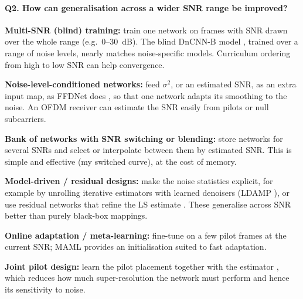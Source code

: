 \documentclass[a4paper,10pt]{article}
\newenvironment{packed_enum}{
\begin{enumerate}
  \setlength{\itemsep}{1.5pt}
  \setlength{\parskip}{0pt}
  \setlength{\parsep}{0pt}
}{\end{enumerate}}
\begin{document}
\paragraph{Q2. How can generalisation across a wider SNR range be improved?}
\begin{packed_enum}
    \item \textbf{Multi-SNR (blind) training:} train one network on frames with SNR drawn over the whole range (e.g.\ 0--30~dB). The blind DnCNN-B model \cite{zhang2017}, trained over a range of noise levels, nearly matches noise-specific models. Curriculum ordering from high to low SNR can help convergence.
    \item \textbf{Noise-level-conditioned networks:} feed $\sigma^2$, or an estimated SNR, as an extra input map, as FFDNet does \cite{zhang2018ffdnet}, so that one network adapts its smoothing to the noise. An OFDM receiver can estimate the SNR easily from pilots or null subcarriers.
    \item \textbf{Bank of networks with SNR switching or blending:} store networks for several SNRs and select or interpolate between them by estimated SNR. This is simple and effective (my switched curve), at the cost of memory.
    \item \textbf{Model-driven / residual designs:} make the noise statistics explicit, for example by unrolling iterative estimators with learned denoisers (LDAMP \cite{he2018}), or use residual networks that refine the LS estimate \cite{li2020reesnet}. These generalise across SNR better than purely black-box mappings.
    \item \textbf{Online adaptation / meta-learning:} fine-tune on a few pilot frames at the current SNR; MAML \cite{finn2017} provides an initialisation suited to fast adaptation.
    \item \textbf{Joint pilot design:} learn the pilot placement together with the estimator \cite{soltani2020pilot,mashhadi2021}, which reduces how much super-resolution the network must perform and hence its sensitivity to noise.
\end{packed_enum}

\end{document}
